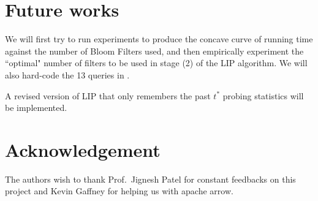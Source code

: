 \documentclass[10pt]{article}
\begin{document}

\section{Future works}

We will first try to run experiments to produce the concave curve of running time against the number of Bloom Filters used, and then empirically experiment the ``optimal" number of filters to be used in stage (2) of the LIP algorithm. We will also hard-code the 13 queries in \cite{o2009star}.

A revised version of LIP that only remembers the past $t^*$ probing statistics will be implemented.



\section*{Acknowledgement}
The authors wish to thank Prof.\ Jignesh Patel for constant feedbacks on this project and Kevin Gaffney for helping us with apache arrow.


{}

\end{document}
